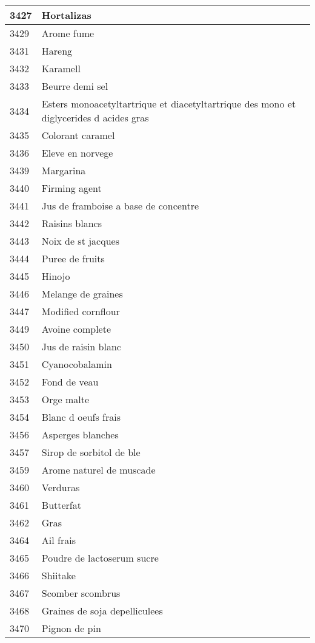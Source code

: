 \begin{longtable}{|l|l|}
3427 & Hortalizas \\ \hline 
3429 & Arome fume \\ \hline 
3431 & Hareng \\ \hline 
3432 & Karamell \\ \hline 
3433 & Beurre demi sel \\ \hline 
3434 & Esters monoacetyltartrique et diacetyltartrique des mono et diglycerides d acides gras \\ \hline 
3435 & Colorant caramel \\ \hline 
3436 & Eleve en norvege \\ \hline 
3439 & Margarina \\ \hline 
3440 & Firming agent \\ \hline 
3441 & Jus de framboise a base de concentre \\ \hline 
3442 & Raisins blancs \\ \hline 
3443 & Noix de st jacques \\ \hline 
3444 & Puree de fruits \\ \hline 
3445 & Hinojo \\ \hline 
3446 & Melange de graines \\ \hline 
3447 & Modified cornflour \\ \hline 
3449 & Avoine complete \\ \hline 
3450 & Jus de raisin blanc \\ \hline 
3451 & Cyanocobalamin \\ \hline 
3452 & Fond de veau \\ \hline 
3453 & Orge malte \\ \hline 
3454 & Blanc d oeufs frais \\ \hline 
3456 & Asperges blanches \\ \hline 
3457 & Sirop de sorbitol de ble \\ \hline 
3459 & Arome naturel de muscade \\ \hline 
3460 & Verduras \\ \hline 
3461 & Butterfat \\ \hline 
3462 & Gras \\ \hline 
3464 & Ail frais \\ \hline 
3465 & Poudre de lactoserum sucre \\ \hline 
3466 & Shiitake \\ \hline 
3467 & Scomber scombrus \\ \hline 
3468 & Graines de soja depelliculees \\ \hline 
3470 & Pignon de pin \\ \hline 

\end{longtable}

